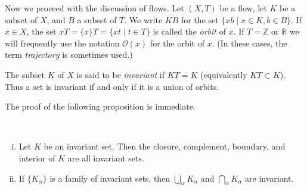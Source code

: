 Now we proceed with the discussion of flows. Let $(X,T)$ be a flow, let $K$ be a subset of $X$, and $B$ a subset of $T$. We write $KB$ for the set $\{xb \mid x \in K, b \in B\}$. If $x \in X$, the set $xT = \{x\}T = \{xt \mid t \in T\}$ is called the \emph{orbit} of $x$. If $T = \mathbb{Z}$ or $\mathbb{R}$ we will frequently use the notation $\mathcal{O}(x)$ for the orbit of $x$. (In these cases, the term \emph{trajectory} is sometimes used.)

The subset $K$ of $X$ is said to be \emph{invariant} if $KT = K$ (equivalently $KT \subset K$). Thus a set is invariant if and only if it is a union of orbits.

The proof of the following proposition is immediate.

\begin{proposition}~
    \begin{enumerate}[(i)]
        \item Let $K$ be an invariant set. Then the closure, complement, boundary, and interior of $K$ are all invariant sets.
        \item If $\{K_\alpha\}$ is a family of invariant sets, then $\bigcup_\alpha K_\alpha$ and $\bigcap_\alpha K_\alpha$ are invariant.
    \end{enumerate}
\end{proposition}
